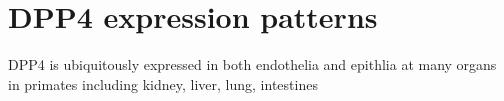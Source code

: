 \section{DPP4 expression patterns}
DPP4 is ubiquitously expressed in both endothelia and epithlia at many organs in primates including kidney, liver, lung, intestines 